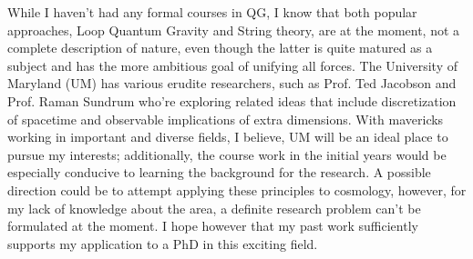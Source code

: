 While I haven't had any formal courses in QG, I know that both popular approaches, Loop Quantum Gravity and String theory, are at the moment, not a complete description of nature, even though the latter is quite matured as a subject and has the more ambitious goal of unifying all forces. The University of Maryland (UM) has various erudite researchers, such as Prof. Ted Jacobson and Prof. Raman Sundrum who're exploring related ideas that include discretization of spacetime and observable implications of extra dimensions. With mavericks working in important and diverse fields, I believe, UM will be an ideal place to pursue my interests; additionally, the course work in the initial years would be especially conducive to learning the background for the research. A possible direction could be to attempt applying these principles to cosmology, however, for my lack of knowledge about the area, a definite research problem can't be formulated at the moment. I hope however that my past work sufficiently supports my application to a PhD in this exciting field.







